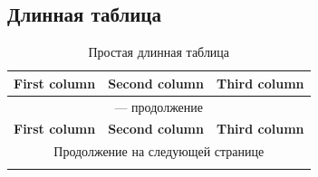 \documentclass[12pt, a4paper]{article}
\begin{document}
\subsection{Длинная таблица}

\begin{center}
\begin{longtable}{|l|l|l|}
\caption{Простая длинная таблица} \label{tab:long} \\
\hline
\textbf{First column} & \textbf{Second column} & \textbf{Third column} \\ \hline 
\endfirsthead

\multicolumn{3}{c}{\tablename{} \thetable{} --- продолжение } \\
\hline 
\textbf{First column}&\textbf{Second column} & \textbf{Third column} \\
\hline 
\endhead

\hline
\multicolumn{3}{|c|}{Продолжение на следующей странице} \\ \hline
\endfoot
\hline
\endlastfoot



\end{longtable}
\end{center}
\end{document}
